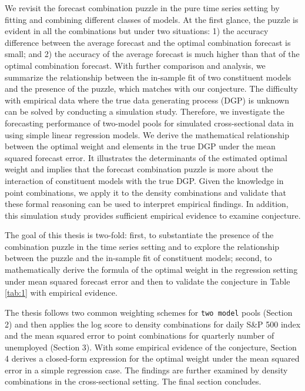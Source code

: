 \documentclass{monashthesis}
\begin{document}
We revisit the forecast combination puzzle in the pure time series setting by fitting and combining different classes of models. At the first glance, the puzzle is evident in all the combinations but under two situations: 1) the accuracy difference between the average forecast and the optimal combination forecast is small; and 2) the accuracy of the average forecast is much higher than that of the optimal combination forecast. With further comparison and analysis, we summarize the relationship between the in-sample fit of two constituent models and the presence of the puzzle, which matches with our conjecture. The difficulty with empirical data where the true data generating process (DGP) is unknown can be solved by conducting a simulation study. Therefore, we investigate the forecasting performance of two-model pools for simulated cross-sectional data in using simple linear regression models. We derive the mathematical relationship between the optimal weight and elements in the true DGP under the mean squared forecast error. It illustrates the determinants of the estimated optimal weight and implies that the forecast combination puzzle is more about the interaction of constituent models with the true DGP. Given the knowledge in point combinations, we apply it to the density combinations and validate that these formal reasoning can be used to interpret empirical findings. In addition, this simulation study provides sufficient empirical evidence to examine conjecture.

The goal of this thesis is two-fold: first, to substantiate the presence of the combination puzzle in the time series setting and to explore the relationship between the puzzle and the in-sample fit of constituent models; second, to mathematically derive the formula of the optimal weight in the regression setting under mean squared forecast error and then to validate the conjecture in Table \ref{tab:1} with empirical evidence.

The thesis follows two common weighting schemes for \texttt{two\ model} pools (Section 2) and then applies the log score to density combinations for daily S\&P 500 index and the mean squared error to point combinations for quarterly number of unemployed (Section 3). With some empirical evidence of the conjecture, Section 4 derives a closed-form expression for the optimal weight under the mean squared error in a simple regression case. The findings are further examined by density combinations in the cross-sectional setting. The final section concludes.
\end{document}

